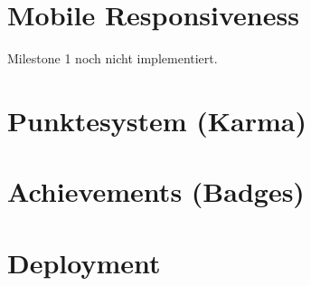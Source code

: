 \section{Mobile Responsiveness} \label{spez:Mobile}

Milestone 1 noch nicht implementiert.

\section{Punktesystem (Karma)} \label{spez:Karma}
\section{Achievements (Badges)} \label{spez:Badges}
\section{Deployment} \label{spez:Deployment}
